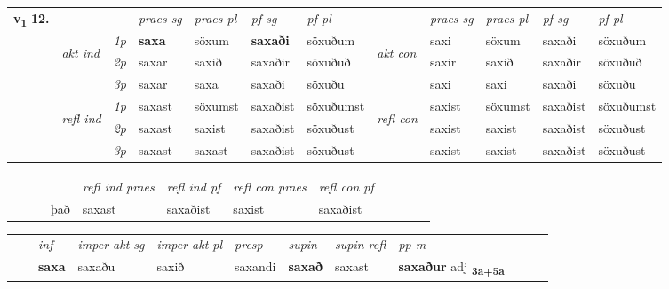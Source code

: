 \begin{tabular}{llllllllllll} \toprule
\multirow{4}{*}{{{\textbf{v{\textsubscript{1}}} \Large{\textbf{12.}}}}}  & &   &  \textit{praes sg}  & \textit{praes pl}  &\textit{ pf sg} & \textit{pf pl} &  &  \textit{praes sg}  & \textit{praes pl}  & \textit{pf sg} & \textit{pf pl } \\*
	\cmidrule{4-7} \cmidrule{9-12}
 & \multirow{3}{*}{\begin{turn}{90}\textit{akt ind}\end{turn}} & {\textit{1p}} & \textbf{saxa} & söxum    & \textbf{saxaði} & söxuðum & \multirow{3}{*}{\begin{turn}{90}\textit{akt con}\end{turn}} &saxi & söxum & saxaði & söxuðum\\*
& &  {\textit{2p}} &  saxar  & saxið   & saxaðir & söxuðuð & & saxir & saxið & saxaðir & söxuðuð \\*
& &  {\textit{3p}} & saxar & saxa   & saxaði & söxuðu & & saxi & saxi& saxaði & söxuðu  \\*
\cmidrule{4-7} \cmidrule{9-12}
 &\multirow{3}{*}{\begin{turn}{90}\textit{refl ind}\end{turn}} & {\textit{1p}} & saxast & söxumst    & saxaðist & söxuðumst & \multirow{3}{*}{\begin{turn}{90}\textit{refl con}\end{turn}}  &saxist & söxumst & saxaðist & söxuðumst\\*
 &&  {\textit{2p}} &  saxast  & saxist   & saxaðist & söxuðust & &saxist & saxist & saxaðist & söxuðust \\*
& &  {\textit{3p}} & saxast & saxast   & saxaðist & söxuðust & & saxist & saxist& saxaðist & söxuðust  \\*
\cmidrule{4-7} \cmidrule{9-12}
\end{tabular}


\begin{tabular}{llllllllllll}
 & &  & &  \textit{refl ind praes} & \textit{refl ind pf} & \textit{refl con praes} & \textit{refl con pf} \\*
 & &  & það & saxast & saxaðist & saxist & saxaðist \\*
\cmidrule{5-9}
\end{tabular}


\begin{tabular}{llllllllllll}
 & & \textit{inf} & \textit{imper akt sg} & \textit{imper akt pl}   & \textit{presp} & \textit{supin} & \textit{supin refl} & \textit{pp m}     \\*
  & & \textbf{saxa} & saxaðu  & saxið   & saxandi &  \textbf{saxað} & saxast & \textbf{saxaður} adj \textbf{\textsubscript{3a+5a}} \\*
\cmidrule{1-12}
\end{tabular}



